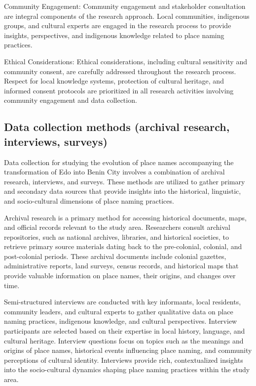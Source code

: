 Community Engagement: Community engagement and stakeholder consultation are integral components of the research approach. Local communities, indigenous groups, and cultural experts are engaged in the research process to provide insights, perspectives, and indigenous knowledge related to place naming practices.

Ethical Considerations: Ethical considerations, including cultural sensitivity and community consent, are carefully addressed throughout the research process. Respect for local knowledge systems, protection of cultural heritage, and informed consent protocols are prioritized in all research activities involving community engagement and data collection.
\subsection{Data collection methods (archival research, interviews, surveys)}
Data collection for studying the evolution of place names accompanying the transformation of Edo into Benin City involves a combination of archival research, interviews, and surveys. These methods are utilized to gather primary and secondary data sources that provide insights into the historical, linguistic, and socio-cultural dimensions of place naming practices.

Archival research is a primary method for accessing historical documents, maps, and official records relevant to the study area. Researchers consult archival repositories, such as national archives, libraries, and historical societies, to retrieve primary source materials dating back to the pre-colonial, colonial, and post-colonial periods. These archival documents include colonial gazettes, administrative reports, land surveys, census records, and historical maps that provide valuable information on place names, their origins, and changes over time.

Semi-structured interviews are conducted with key informants, local residents, community leaders, and cultural experts to gather qualitative data on place naming practices, indigenous knowledge, and cultural perspectives. Interview participants are selected based on their expertise in local history, language, and cultural heritage. Interview questions focus on topics such as the meanings and origins of place names, historical events influencing place naming, and community perceptions of cultural identity. Interviews provide rich, contextualized insights into the socio-cultural dynamics shaping place naming practices within the study area.

